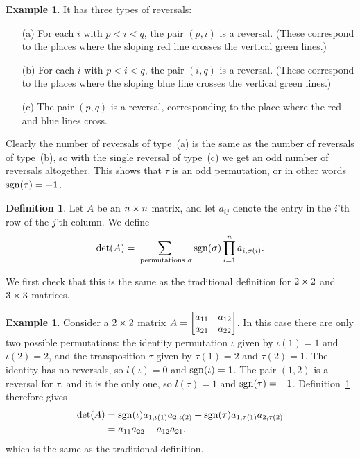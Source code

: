 \documentclass[reqno]{amsart}
\theoremstyle{definition}
\newtheorem{definition}[theorem]{Definition}
\newtheorem{example}[theorem]{Example}
\begin{document}
\begin{example}
 It has three types of reversals:
 \begin{itemize}
  \item[(a)] For each $i$ with $p<i<q$, the pair $(p,i)$ is a
   reversal.  (These correspond to the places where the sloping red
   line crosses the vertical green lines.)
  \item[(b)] For each $i$ with $p<i<q$, the pair $(i,q)$ is a
   reversal.  (These correspond to the places where the sloping blue
   line crosses the vertical green lines.)
  \item[(c)] The pair $(p,q)$ is a reversal, corresponding to the
   place where the red and blue lines cross.
 \end{itemize}
 Clearly the number of reversals of type~(a) is the same as the
 number of reversals of type~(b), so with the single reversal of
 type~(c) we get an odd number of reversals altogether.  This shows
 that $\tau$ is an odd permutation, or in other words
 $\operatorname{sgn}(\tau)=-1$.
\end{example}

\begin{definition}\label{defn-det}
 Let $A$ be an $n\times n$ matrix, and let $a_{ij}$ denote the entry in
 the $i$'th row of the $j$'th column.  We define
 \[ \det(A) =
     \sum_{\text{ permutations } \sigma} \operatorname{sgn}(\sigma) \prod_{i=1}^n
     a_{i,\sigma(i)}.
 \]
\end{definition}

We first check that this is the same as the traditional definition for
$2\times 2$ and $3\times 3$ matrices.

\begin{example}\label{eg-det-two}
 Consider a $2\times 2$ matrix
 $A=\left[\begin{matrix} a_{11}&a_{12}\\ a_{21}&a_{22}\end{matrix}\right]$.  In this case there are
 only two possible permutations: the identity permutation $\iota$
 given by $\iota(1)=1$ and $\iota(2)=2$, and the transposition $\tau$
 given by $\tau(1)=2$ and $\tau(2)=1$.  The identity has no reversals,
 so $l(\iota)=0$ and $\operatorname{sgn}(\iota)=1$.  The pair $(1,2)$ is a reversal
 for $\tau$, and it is the only one, so $l(\tau)=1$ and
 $\operatorname{sgn}(\tau)=-1$.  Definition~\ref{defn-det} therefore gives
 \begin{align*}
  \det(A) &= \operatorname{sgn}(\iota)a_{1,\iota(1)}a_{2,\iota(2)} +
             \operatorname{sgn}(\tau) a_{1,\tau(1)}a_{2,\tau(2)} \\
          &= a_{11} a_{22} - a_{12}a_{21},
 \end{align*}
 which is the same as the traditional definition.
\end{example}
\end{document}
